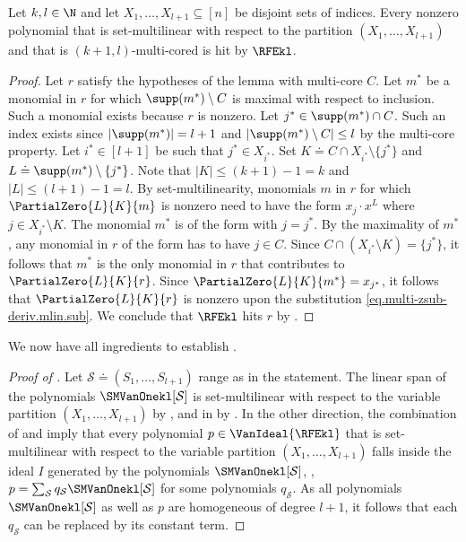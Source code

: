 \documentclass{toc}
\begin{document}
\begin{lemma}
  \label{lemma.rfe-hits-multicored}
  Let \(k,l\in \N\) 
  and let \(X_1, \dots, X_{l+1} \subseteq [n]\) be disjoint sets of indices.
  Every nonzero polynomial that is set-multilinear with respect to
  the partition $(X_1,\dots,X_{l+1})$ and that is \((k+1,l)\)-multi-cored
  is hit by \(\RFEkl\).
\end{lemma}

\begin{proof}
  Let $r$ satisfy the hypotheses of the lemma with multi-core $C$. Let $m^*$ be a monomial in $r$ for which $\supp(m^*) \setminus C$ is maximal with respect to inclusion. Such a monomial exists because $r$ is nonzero. Let $j^* \in \supp(m^*) \cap C$. Such an index exists since $|\supp(m^*)|=l+1$ and $|\supp(m^*) \setminus C| \le l$ by the multi-core property. Let $i^* \in [l+1]$ be such that $j^* \in X_{i^*}$. Set $K \doteq C \cap X_{i^*} \setminus \{j^*\}$ and $L \doteq \supp(m^*) \setminus \{j^*\}$. Note that $|K| \le (k+1)-1=k$ and $|L| \le (l+1)-1=l$. By set-multilinearity, monomials $m$ in $r$ for which \(\PartialZero{L}{K}{m}\) is nonzero need to have the form $x_j \cdot x^L$ where $j \in X_{i^*} \setminus K$. The monomial $m^*$ is of the form with $j=j^*$. By the maximality of $m^*$, any monomial in $r$ of the form has to have $j \in C$. Since $C \cap (X_{i^*} \setminus K) = \{j^*\}$, it follows that $m^*$ is the only monomial in $r$ that contributes to $\PartialZero{L}{K}{r}$. Since $\PartialZero{L}{K}{m^*} = x_{j^*}$, it follows that 
  $\PartialZero{L}{K}{r}$ is nonzero upon the substitution
  \eqref{eq.multi-zsub-deriv.mlin.sub}. We conclude that \(\RFEkl\) hits $r$ by .
\end{proof}

We now have all ingredients to establish . 

\begin{proof}[Proof of ]
    Let $\mathcal{S} \doteq (S_1, \dots, S_{l+1})$ range as in the statement. The linear span of the polynomials $\SMVanOnekl[\mathcal{S}]$ is set-multilinear with respect to the variable partition $(X_1, \dots, X_{l+1})$ by , and in \VanIdeal{\RFEkl} by 
    . 
    In the other direction, the combination of  and  imply that every polynomial $p \in \VanIdeal{\RFEkl}$ that is set-multilinear with respect to the variable partition $(X_1, \dots, X_{l+1})$ falls inside the ideal $I$ generated by the polynomials $\SMVanOnekl[\mathcal{S}]$, \ie, $p = \sum_{\mathcal{S}} q_{\mathcal{S}} \SMVanOnekl[\mathcal{S}]$ for some polynomials $q_{\mathcal{S}}$.
    As all polynomials $\SMVanOnekl[\mathcal{S}]$ as well as $p$ are homogeneous of degree $l+1$, it follows that each $q_{\mathcal{S}}$ can be replaced by its constant term. 
\end{proof}
\end{document}
